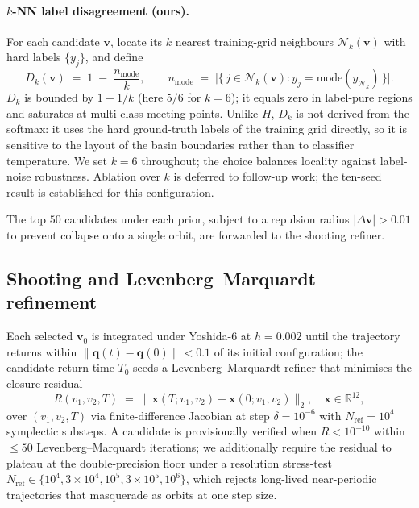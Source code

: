 \documentclass[10pt]{article}
\newcommand{\vvec}{\mathbf{v}}
\newcommand{\xvec}{\mathbf{x}}
\newcommand{\qvec}{\mathbf{q}}
\newcommand{\Norm}[1]{\left\lVert#1\right\rVert}
\newcommand{\RR}{\mathbb{R}}
\begin{document}
\paragraph{$k$-NN label disagreement (ours).}
For each candidate $\vvec$, locate its $k$ nearest training-grid
neighbours $\mathcal{N}_k(\vvec)$ with hard labels $\{y_j\}$, and
define
\begin{equation}
  D_k(\vvec) \;=\; 1 \;-\; \frac{n_{\mathrm{mode}}}{k},
  \qquad
  n_{\mathrm{mode}} \;=\; \bigl| \{\, j \in \mathcal{N}_k(\vvec) :
    y_j = \mathrm{mode}(y_{\mathcal{N}_k}) \,\} \bigr|.
  \label{eq:disagreement}
\end{equation}
$D_k$ is bounded by $1 - 1/k$ (here $5/6$ for $k = 6$); it equals zero
in label-pure regions and saturates at multi-class meeting points.
Unlike $H$, $D_k$ is not derived from the softmax: it uses the hard
ground-truth labels of the training grid directly, so it is sensitive
to the layout of the basin boundaries rather than to classifier
temperature. We set $k = 6$ throughout; the choice balances locality
against label-noise robustness. Ablation over $k$ is deferred to
follow-up work; the ten-seed result is established for this
configuration.

The top $50$ candidates under each prior, subject to a repulsion
radius $|\Delta \vvec| > 0.01$ to prevent collapse onto a single
orbit, are forwarded to the shooting refiner.

\subsection{Shooting and Levenberg--Marquardt refinement}

Each selected $\vvec_0$ is integrated under Yoshida-$6$ at $h = 0.002$
until the trajectory returns within $\Norm{\qvec(t) - \qvec(0)} < 0.1$
of its initial configuration; the candidate return time $T_0$ seeds a
Levenberg--Marquardt refiner that minimises the closure residual
\begin{equation}
  R(v_1, v_2, T) \;=\; \bigl\lVert \xvec(T; v_1, v_2) - \xvec(0; v_1, v_2) \bigr\rVert_2,
  \quad \xvec \in \RR^{12},
  \label{eq:closure-residual}
\end{equation}
over $(v_1, v_2, T)$ via finite-difference Jacobian at step
$\delta = 10^{-6}$ with $N_{\mathrm{ref}} = 10^{4}$ symplectic
substeps. A candidate is provisionally verified when $R < 10^{-10}$
within $\le\!50$ Levenberg--Marquardt iterations; we additionally
require the residual to plateau at the double-precision floor under a
resolution stress-test
$N_{\mathrm{ref}} \in \{10^4, 3\!\times\!10^4, 10^5, 3\!\times\!10^5, 10^6\}$,
which rejects long-lived near-periodic trajectories that masquerade
as orbits at one step size.
\end{document}

